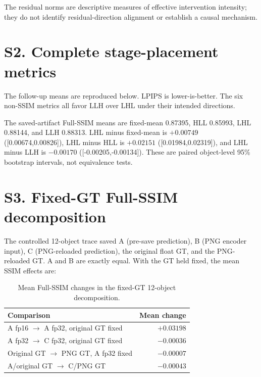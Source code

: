 \documentclass[10pt]{article}
\begin{document}
The residual norms are descriptive measures of effective intervention
intensity; they do not identify residual-direction alignment or establish a
causal mechanism.

\section{S2. Complete stage-placement metrics}

The follow-up means are reproduced below. LPIPS is lower-is-better. The six
non-SSIM metrics all favor LLH over LHL under their intended directions.

\begin{table}[h]
\centering\scriptsize
{}
\end{table}

The saved-artifact Full-SSIM means are fixed-mean 0.87395, HLL 0.85993, LHL
0.88144, and LLH 0.88313. LHL minus fixed-mean is $+0.00749$
([0.00674,0.00826]), LHL minus HLL is $+0.02151$ ([0.01984,0.02319]), and
LHL minus LLH is $-0.00170$ ([-0.00205,-0.00134]). These are paired
object-level 95\% bootstrap intervals, not equivalence tests.

\section{S3. Fixed-GT Full-SSIM decomposition}

The controlled 12-object trace saved A (pre-save prediction), B (PNG encoder
input), C (PNG-reloaded prediction), the original float GT, and the
PNG-reloaded GT. A and B are exactly equal. With the GT held fixed, the mean
SSIM effects are:

\begin{table}[h]
\centering\small
\caption{Mean Full-SSIM changes in the fixed-GT 12-object decomposition.}
\begin{tabular}{lr}
\toprule
Comparison & Mean change \\
\midrule
A fp16 $\rightarrow$ A fp32, original GT fixed & $+0.03198$ \\
A fp32 $\rightarrow$ C fp32, original GT fixed & $-0.00036$ \\
Original GT $\rightarrow$ PNG GT, A fp32 fixed & $-0.00007$ \\
A/original GT $\rightarrow$ C/PNG GT & $-0.00043$ \\
\bottomrule
\end{tabular}
\end{table}
\end{document}
